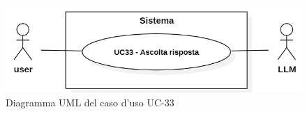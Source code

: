 \begin{figure}[H]
    \centering
    \includegraphics[width=0.9\linewidth]{UC33.PNG}
    \caption{Diagramma UML del caso d'uso UC-33}
    \label{fig:UC33}
\end{figure}
